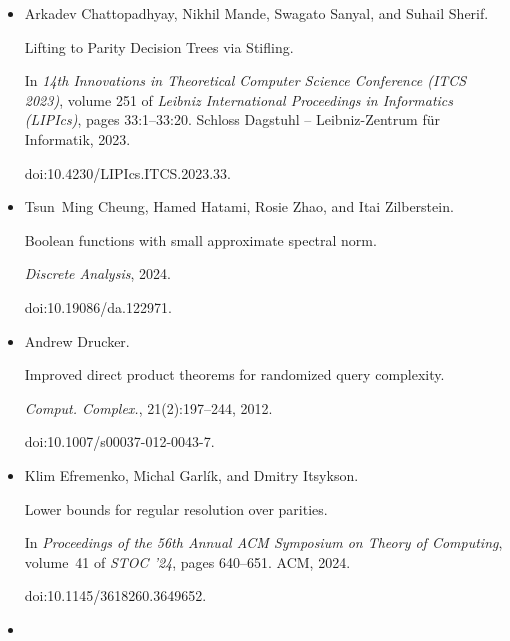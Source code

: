 \documentclass[10pt,a4paper]{article}
\begin{document}
\begin{itemize}
URL: https://eccc.weizmann.ac.il/report/2024/132/.





\item[] 
[19]

Arkadev Chattopadhyay, Nikhil Mande, Swagato Sanyal, and Suhail Sherif.


Lifting to Parity Decision Trees via Stifling.


In \emph{14th Innovations in Theoretical Computer Science Conference
(ITCS 2023)}, volume 251 of \emph{Leibniz International Proceedings in
Informatics (LIPIcs)}, pages 33:1–33:20. Schloss Dagstuhl – Leibniz-Zentrum
für Informatik, 2023.


doi:10.4230/LIPIcs.ITCS.2023.33.





\item[] 
[20]

Tsun Ming Cheung, Hamed Hatami, Rosie Zhao, and Itai Zilberstein.


Boolean functions with small approximate spectral norm.


\emph{Discrete Analysis}, 2024.


doi:10.19086/da.122971.





\item[] 
[21]

Andrew Drucker.


Improved direct product theorems for randomized query complexity.


\emph{Comput. Complex.}, 21(2):197–244, 2012.


doi:10.1007/s00037-012-0043-7.





\item[] 
[22]

Klim Efremenko, Michal Garlík, and Dmitry Itsykson.


Lower bounds for regular resolution over parities.


In \emph{Proceedings of the 56th Annual ACM Symposium on Theory of
Computing}, volume 41 of \emph{STOC ’24}, pages 640–651. ACM, 2024.


doi:10.1145/3618260.3649652.





\item[] 
[23]


\end{itemize}
\end{document}
